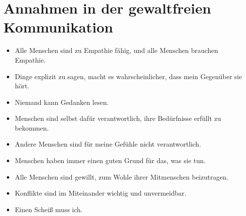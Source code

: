 \section{Annahmen in der gewaltfreien Kommunikation}
\label{gfk-annahmen}

\begin{itemize}
  \item Alle Menschen sind zu Empathie fähig, und alle Menschen brauchen Empathie.
  \item Dinge explizit zu sagen, macht es wahrscheinlicher, dass mein Gegenüber sie hört.
  \item Niemand kann Gedanken lesen.
  \item Menschen sind selbst dafür verantwortlich, ihre Bedürfnisse erfüllt zu bekommen.
  \item Andere Menschen sind für meine Gefühle nicht verantwortlich.
  \item Menschen haben immer einen guten Grund für das, was sie tun.
  \item Alle Menschen sind gewillt, zum Wohle ihrer Mitmenschen beizutragen.
  \item Konflikte sind im Miteinander wichtig und unvermeidbar.
  \item Einen Scheiß muss ich.
\end{itemize}
